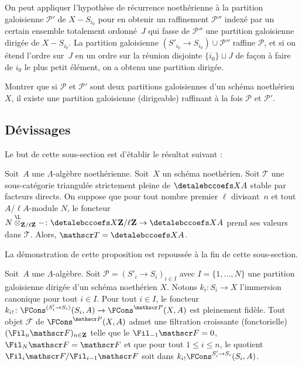 \documentclass[10pt]{../fichiers-configuration-latex/smfart}
\begin{document}
On peut appliquer l'hypothèse de
récurrence noethérienne à la partition galoisienne $\mathscr P'$ 
de $X-S_{i_0}$ pour en obtenir un raffinement $\mathscr P''$ indexé par un
certain ensemble totalement ordonné $J$ qui fasse de $\mathscr P''$ une
partition galoisienne dirigée de $X-S_{i_0}$. La partition galoisienne
$(S'_{i_0}\to S_{i_0})\cup \mathscr P''$ raffine $\mathscr P$, et si on
étend l'ordre sur $J$ en un ordre sur la réunion disjointe $\{i_0\}\sqcup
J$ de façon à faire de $i_0$ le plus petit élément, on a obtenu une
partition dirigée.

\begin{exercice2}\label{17-exercice-partitions-ensemble-filtrant}
Montrer que si $\mathscr P$ et $\mathscr P'$ sont deux partitions
galoisiennes d'un schéma noethérien $X$, il existe une partition
galoisienne (dirigeable) raffinant à la fois $\mathscr P$ et $\mathscr P'$.
\end{exercice2}

\subsection{Dévissages}%

Le but de cette sous-section est d'établir le résultat suivant :

\begin{proposition2}\label{17-proposition-devissage-coefficients}
Soit $A$ une $\Lambda$-algèbre noethérienne.
Soit $X$ un schéma noethérien.
Soit $\mathscr T$ une sous-catégorie triangulée strictement pleine de
$\detalebccoefs X A$ stable par facteurs directs. On suppose que pour tout
nombre premier $\ell$ divisant $n$ et tout $A/\ell A$-module $N$, le
foncteur $N\overset{\L}{\otimes}_{\mathbf{Z}/\ell\mathbf{Z}}-\colon
\detalebccoefs X
{\mathbf{Z}/\ell\mathbf{Z}}\to \detalebccoefs X A$ prend ses valeurs dans
$\mathscr T$. Alors, $\mathscr T=\detalebccoefs X A$.
\end{proposition2}

La démonstration de cette proposition est repoussée à la fin de cette
sous-section.

\begin{proposition2}\label{17-proposition-devissage-partitions-galoisiennes-trivial}
Soit $A$ une $\Lambda$-algèbre.
Soit $\mathscr P=(S'_i\to S_i)_{i\in I}$ avec
$I=\{1,\dots,N\}$ une
partition galoisienne dirigée d'un schéma noethérien $X$. 
Notons $k_i\colon S_i\to X$ l'immersion canonique pour tout $i\in I$. Pour
tout $i\in I$, le foncteur ${k_i}_!\colon \FCons^{(S'_i\to S_i)}(S_i,A)\to
\FCons^{\mathscr P}(X,A)$ est pleinement fidèle. Tout objet $\mathscr F$ de
$\FCons^{\mathscr P}(X,A)$ admet une filtration croissante (fonctorielle)
$(\Fil_n \mathscr F)_{n\in\mathbf{Z}}$ telle que le $\Fil_{-1}\mathscr F=0$,
$\Fil_{N}\mathscr F=\mathscr F$ et que pour tout $1\leq i\leq n$, le
quotient $\Fil_i\mathscr F/\Fil_{i-1}\mathscr F$ soit dans
${k_i}_!\FCons^{S'_i\to S_i}(S_i,A)$.
\end{proposition2}
\end{document}
